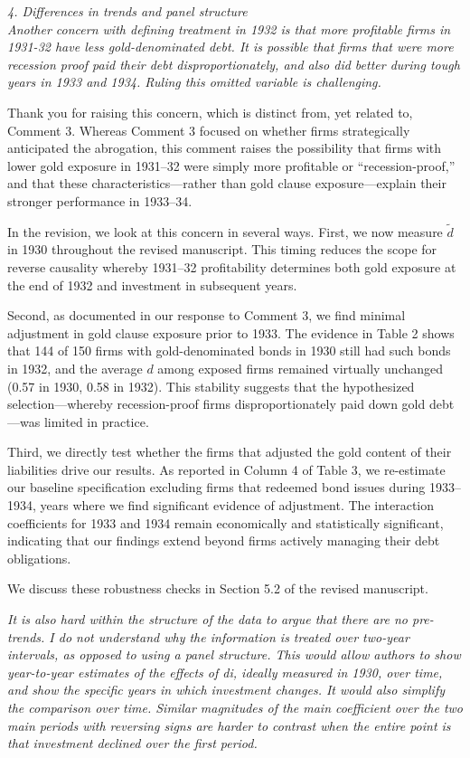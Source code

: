 \noindent \textit{\textcolor{red!60!black}{
4. Differences in trends and panel structure\\ 
Another concern with defining treatment in 1932 is that more profitable firms in 1931-32 have less gold-denominated debt. It is possible that firms that were more recession proof paid their debt disproportionately, and also did better during tough years in 1933 and 1934. Ruling this omitted variable is challenging.
}}

\noindent Thank you for raising this concern, which is distinct from, yet related to, Comment 3. Whereas Comment 3 focused on whether firms strategically anticipated the abrogation, this comment raises the possibility that firms with lower gold exposure in 1931--32 were simply more profitable or ``recession-proof,'' and that these characteristics---rather than gold clause exposure---explain their stronger performance in 1933--34.

In the revision, we look at this concern in several ways. First, we now measure $\tilde{d}$ in 1930 throughout the revised manuscript. This timing reduces the scope for reverse causality whereby 1931--32 profitability determines both gold exposure at the end of 1932 and investment in subsequent years.

Second, as documented in our response to Comment 3, we find minimal adjustment in gold clause exposure prior to 1933. The evidence in Table 2 shows that 144 of 150 firms with gold-denominated bonds in 1930 still had such bonds in 1932, and the average $d$ among exposed firms remained virtually unchanged (0.57 in 1930, 0.58 in 1932). This stability suggests that the hypothesized selection---whereby recession-proof firms disproportionately paid down gold debt---was limited in practice.

Third, we directly test whether the firms that adjusted the gold content of their liabilities drive our results. As reported in Column 4 of Table 3, we re-estimate our baseline specification excluding firms that redeemed bond issues during 1933--1934, years where we find significant evidence of adjustment. The interaction coefficients for 1933 and 1934 remain economically and statistically significant, indicating that our findings extend beyond firms actively managing their debt obligations.

We discuss these robustness checks in Section 5.2 of the revised manuscript.


\noindent \textit{\textcolor{red!60!black}{
It is also hard within the structure of the data to argue that there are no pre-trends. I do not understand why the information is treated over two-year intervals, as opposed to using a panel structure. This would allow authors to show year-to-year estimates of the effects of di, ideally measured in 1930, over time, and show the specific years in which investment changes. It would also simplify the comparison over time. Similar magnitudes of the main coefficient over the two main periods with reversing signs are harder to contrast when the entire point is that investment declined over the first period.
}}

